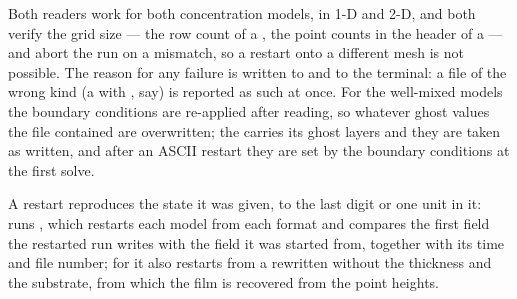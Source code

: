 Both readers work for both concentration models, in 1-D and 2-D, and both
verify the grid size --- the row count of a , the point counts
in the header of a  --- and abort the run on a mismatch, so a
restart onto a different mesh is not possible. The reason for any failure is
written to  and to the terminal: a file of the wrong
kind (a  with , say) is reported as such
at once. For the well-mixed models the boundary conditions are re-applied after
reading, so whatever ghost values the file contained are overwritten; the
  carries its ghost layers and they are taken as written,
and after an ASCII restart they are set by the boundary conditions at the first
solve.

A restart reproduces the state it was given, to the last digit or one unit in
it:  runs , which restarts each model from
each format and compares the first field the restarted run writes with the
field it was started from, together with its time and file number; for
 it also restarts from a  rewritten without the
thickness and the substrate, from which the film is recovered from the point
heights.

